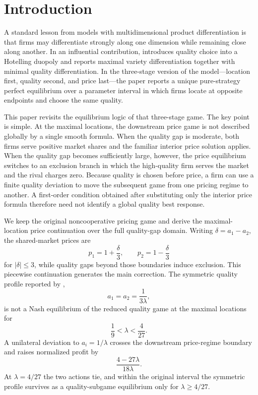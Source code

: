 \section{Introduction}\label{sec:introduction}

A standard lesson from models with multidimensional product differentiation is that firms may differentiate strongly along one dimension while remaining close along another. In an influential contribution, \citet{Economides1989} introduces quality choice into a Hotelling duopoly and reports maximal variety differentiation together with minimal quality differentiation. In the three-stage version of the model---location first, quality second, and price last---the paper reports a unique pure-strategy perfect equilibrium over a parameter interval in which firms locate at opposite endpoints and choose the same quality.

This paper revisits the equilibrium logic of that three-stage game. The key point is simple. At the maximal locations, the downstream price game is not described globally by a single smooth formula. When the quality gap is moderate, both firms serve positive market shares and the familiar interior price solution applies. When the quality gap becomes sufficiently large, however, the price equilibrium switches to an exclusion branch in which the high-quality firm serves the market and the rival charges zero. Because quality is chosen before price, a firm can use a finite quality deviation to move the subsequent game from one pricing regime to another. A first-order condition obtained after substituting only the interior price formula therefore need not identify a global quality best response.

We keep the original noncooperative pricing game and derive the maximal-location price continuation over the full quality-gap domain. Writing $\delta=a_1-a_2$, the shared-market prices are
\[
 p_1=1+\frac{\delta}{3},
 \qquad
 p_2=1-\frac{\delta}{3}
\]
for $|\delta|\leq3$, while quality gaps beyond those boundaries induce exclusion. This piecewise continuation generates the main correction. The symmetric quality profile reported by \citet{Economides1989},
\[
 a_1=a_2=\frac1{3\lambda},
\]
is not a Nash equilibrium of the reduced quality game at the maximal locations for
\[
 \frac19<\lambda<\frac4{27}.
\]
A unilateral deviation to $a_i=1/\lambda$ crosses the downstream price-regime boundary and raises normalized profit by
\[
 \frac{4-27\lambda}{18\lambda}.
\]
At $\lambda=4/27$ the two actions tie, and within the original interval the symmetric profile survives as a quality-subgame equilibrium only for $\lambda\geq4/27$.

